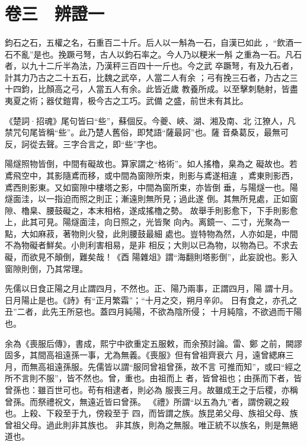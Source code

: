 \documentclass{ctexart}
\begin{document}
\section{卷三　辨證一}
\paragraph{}
鈞石之石，五權之名，石重百二十斤。后人以一斛為一石，自漢已如此 ，``飲酒一石不亂''是也。挽蹶弓弩，古人以鈞石率之。今人乃以粳米一斛 之重為一石。凡石者，以九十二斤半為法，乃漢秤三百四十一斤也。今之武 卒蹶弩，有及九石者，計其力乃古之二十五石，比魏之武卒，人當二人有余 ；弓有挽三石者，乃古之三十四鈞，比顏高之弓，人當五人有余。此皆近歲 教養所成。以至擊刺馳射，皆盡夷夏之術；器仗鎧胄，极今古之工巧。武備 之盛，前世未有其比。

《楚詞·招魂》尾句皆曰``些''，蘇個反。今夔、峽、湖、湘及南、北 江獠人，凡禁咒句尾皆稱``些''。此乃楚人舊俗，即梵語``薩最訶''也。薩 音桑葛反，最無可反，訶從去聲。三字合言之，即``些''字也。

陽燧照物皆倒，中間有礙故也。算家謂之``格術''。如人搖櫓，臬為之 礙故也。若鳶飛空中，其影隨鳶而移，或中間為窗隙所束，則影与鳶遂相違 ，鳶東則影西，鳶西則影東。又如窗隙中樓塔之影，中間為窗所束，亦皆倒 垂，与陽燧一也。陽燧面洼，以一指迫而照之則正；漸遠則無所見；過此遂 倒。其無所見處，正如窗隙、櫓臬、腰鼓礙之，本末相格，遂成搖櫓之勢。 故舉手則影愈下，下手則影愈上，此其可見。陽燧面洼，向日照之，光皆聚 向內。离鏡一、二寸，光聚為一點，大如麻菽，著物則火發，此則腰鼓最細 處也。豈特物為然，人亦如是，中間不為物礙者鮮矣。小則利害相易，是非 相反；大則以已為物，以物為已。不求去礙，而欲見不顛倒，難矣哉！《酉 陽雜俎》謂``海翻則塔影倒''，此妄說也。影入窗隙則倒，乃其常理。

先儒以日食正陽之月止謂四月，不然也。正、陽乃兩事，正謂四月，陽 謂十月。日月陽止是也。《詩》有``正月繁霜''；``十月之交，朔月辛卯。 日有食之，亦孔之丑''二者，此先王所惡也。蓋四月純陽，不欲為陰所侵； 十月純陰，不欲過而干陽也。

余為《喪服后傳》，書成，熙宁中欲重定五服敕，而余預討論。雷、鄭 之前，闕謬固多，其間高祖遠孫一事，尤為無義。《喪服》但有曾祖齊衰六 月，遠曾緦麻三月，而無高祖遠孫服。先儒皆以謂``服同曾祖曾孫，故不言 可推而知''，或曰``經之所不言則不服''，皆不然也。曾，重也。由祖而上 者，皆曾祖也；由孫而下者，皆曾孫也：雖百世可也。苟有相逮者，則必為 服喪三月。故雖成王之于后稷，亦稱曾孫。而祭禮祝文，無遠近皆曰曾孫。 《禮》所謂``以五為九''者，謂傍親之殺也。上殺、下殺至于九，傍殺至于 四，而皆謂之族。族昆弟父母、族祖父母、族曾祖父母。過此則非其族也。 非其族，則為之無服。唯正統不以族名，則是無絕道也。
\end{document}
